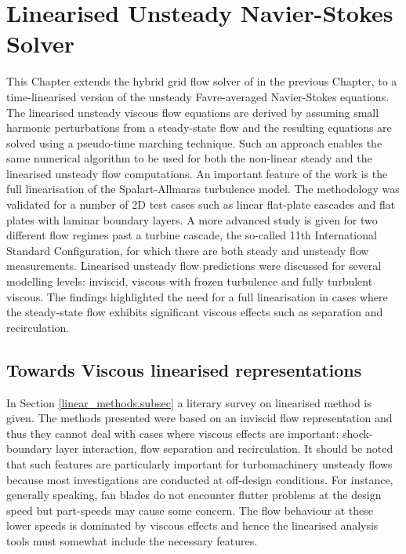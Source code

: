 %
%
%
\chapter{Linearised Unsteady Navier-Stokes Solver}
\label{linear.chap}
\setcounter{footnote}{0}
%
%
%
 This Chapter extends the hybrid grid flow solver of in the previous
 Chapter, to a time-linearised version of the unsteady Favre-averaged Navier-Stokes
 equations.
 The linearised unsteady viscous flow equations are derived by assuming small
 harmonic perturbations from a steady-state flow and
 the resulting equations are solved using a pseudo-time marching technique.
 Such an approach enables the same numerical algorithm to be used for both
 the non-linear steady and the linearised unsteady flow computations.
 An important feature of the work is the full linearisation of
 the Spalart-Allmaras turbulence model. 
 The methodology was validated for a number of 2D test cases such as linear
 flat-plate cascades and flat plates with laminar boundary layers.
 A more advanced study is given for two different flow regimes past a
 turbine cascade, the so-called 11th International Standard Configuration,
 for which there are both steady and unsteady flow measurements.
 Linearised unsteady flow predictions were discussed for several modelling
 levels: inviscid, viscous with frozen turbulence and fully turbulent viscous.
 The findings highlighted the need for a full linearisation in cases where
 the steady-state flow exhibits significant viscous effects such as
 separation and recirculation.
%
\section{Towards Viscous linearised representations}
%
 In Section \ref{linear_methods.subsec} a literary survey on linearised
 method is given. The methods presented were based on an inviscid
 flow representation and thus they cannot deal with cases where viscous
 effects are important:
 shock-boundary layer interaction, flow separation and recirculation.
 It should be noted that such features are particularly important for turbomachinery
 unsteady flows because most investigations are conducted at off-design conditions. 
 For instance, generally speaking, fan blades do not encounter flutter problems at
 the design speed but part-speeds may cause some concern.
 The flow behaviour at these lower speeds is dominated by viscous effects
 and hence the linearised analysis tools must somewhat include the necessary features.
 
